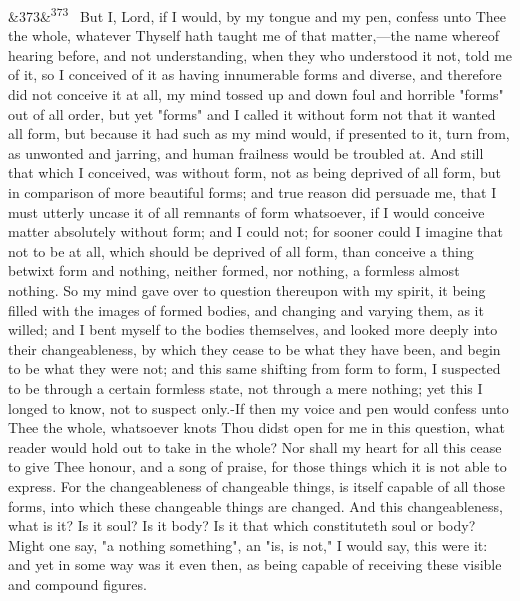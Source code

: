 \documentclass[12pt]{article}
\newcommand{\para}[1][]{\par\noindent\ifx&#1&\else\textsuperscript{\footnotesize #1}~\fi}
\begin{document}
\para[373] But I, Lord, if I would, by my tongue and my pen, confess unto Thee the whole, whatever Thyself hath taught me of that matter,---the name whereof hearing before, and not understanding, when they who understood it not, told me of it, so I conceived of it as having innumerable forms and diverse, and therefore did not conceive it at all, my mind tossed up and down foul and horrible "forms" out of all order, but yet "forms" and I called it without form not that it wanted all form, but because it had such as my mind would, if presented to it, turn from, as unwonted and jarring, and human frailness would be troubled at. And still that which I conceived, was without form, not as being deprived of all form, but in comparison of more beautiful forms; and true reason did persuade me, that I must utterly uncase it of all remnants of form whatsoever, if I would conceive matter absolutely without form; and I could not; for sooner could I imagine that not to be at all, which should be deprived of all form, than conceive a thing betwixt form and nothing, neither formed, nor nothing, a formless almost nothing. So my mind gave over to question thereupon with my spirit, it being filled with the images of formed bodies, and changing and varying them, as it willed; and I bent myself to the bodies themselves, and looked more deeply into their changeableness, by which they cease to be what they have been, and begin to be what they were not; and this same shifting from form to form, I suspected to be through a certain formless state, not through a mere nothing; yet this I longed to know, not to suspect only.-If then my voice and pen would confess unto Thee the whole, whatsoever knots Thou didst open for me in this question, what reader would hold out to take in the whole? Nor shall my heart for all this cease to give Thee honour, and a song of praise, for those things which it is not able to express. For the changeableness of changeable things, is itself capable of all those forms, into which these changeable things are changed. And this changeableness, what is it? Is it soul? Is it body? Is it that which constituteth soul or body? Might one say, "a nothing something", an "is, is not," I would say, this were it: and yet in some way was it even then, as being capable of receiving these visible and compound figures.
\end{document}
